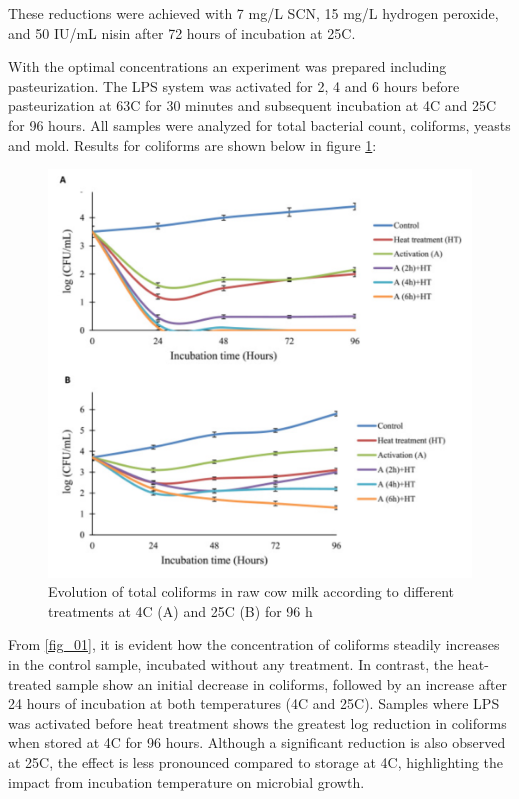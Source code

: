 These reductions were achieved with 7 mg/L SCN, 15 mg/L hydrogen peroxide, and 50 IU/mL nisin after 72 hours of incubation at 25\textdegree C. 

\vline 

With the optimal concentrations an experiment was prepared including pasteurization. The LPS system was activated for 2, 4 and 6 hours before pasteurization at 63\textdegree C for 30 minutes and subsequent incubation at 4\textdegree C and 25\textdegree C for 96 hours. All samples were analyzed for total bacterial count, coliforms, yeasts and mold. Results for coliforms are shown below in figure \ref*{fig_02}:

\begin{figure}[h]
    \center
    \includegraphics[width=0.8\linewidth]{Figures/fig_01.png}
    \caption{Evolution of total coliforms in raw cow milk according to different treatments at 4\textdegree C (A) and 25\textdegree C (B) for 96 h \cite{RM_02}}
    \label{fig_02}
\end{figure}

From \ref*{fig_01}, it is evident how the concentration of coliforms steadily increases in the control sample, incubated without any treatment. In contrast, the heat-treated sample show an initial decrease in coliforms, followed by an increase after 24 hours of incubation at both temperatures (4\textdegree C and 25\textdegree C). Samples where LPS was activated before heat treatment shows the greatest log reduction in coliforms when stored at 4\textdegree C for 96 hours. Although a significant reduction is also observed at 25\textdegree C, the effect is less pronounced compared to storage at 4\textdegree C, highlighting the impact from incubation temperature on microbial growth.

